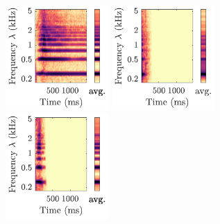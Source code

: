 \documentclass{bmcart}
\begin{document}
\begin{backmatter}
\begin{figure}
\hspace{12mm}
\hspace{22mm}
\hspace{15mm}
\vspace{1cm}


\includegraphics[height=4cm]{figures/flute_scattering/Fl-sfz-C4-fp_scalogram.pdf}
\hspace{8mm}
\includegraphics[trim=35 0 0 0, clip, height=4cm]{figures/flute_scattering/Fl-key-cl-C4-f_scalogram.pdf}
\hspace{12mm}
\includegraphics[trim=35 0 0 0, clip, height=4cm]{figures/flute_scattering/Fl-stacc-C4-mf_scalogram.pdf}



\end{figure}
\end{backmatter}
\end{document}

